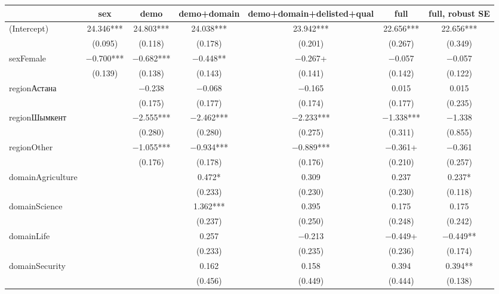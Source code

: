 \begin{table}
\centering
\begin{tabular}[t]{lcccccc}
\toprule
  & sex & demo & demo+domain & demo+domain+delisted+qual & full & full, robust SE\\
\midrule
(Intercept) & \num{24.346}*** & \num{24.803}*** & \num{24.038}*** & \num{23.942}*** & \num{22.656}*** & \num{22.656}***\\
 & (\num{0.095}) & (\num{0.118}) & (\num{0.178}) & (\num{0.201}) & (\num{0.267}) & (\num{0.349})\\
sexFemale & \num{-0.700}*** & \num{-0.682}*** & \num{-0.448}** & \num{-0.267}+ & \num{-0.057} & \num{-0.057}\\
 & (\num{0.139}) & (\num{0.138}) & (\num{0.143}) & (\num{0.141}) & (\num{0.142}) & (\num{0.122})\\
regionАстана &  & \num{-0.238} & \num{-0.068} & \num{-0.165} & \num{0.015} & \num{0.015}\\
 &  & (\num{0.175}) & (\num{0.177}) & (\num{0.174}) & (\num{0.177}) & (\num{0.235})\\
regionШымкент &  & \num{-2.555}*** & \num{-2.462}*** & \num{-2.233}*** & \num{-1.338}*** & \num{-1.338}\\
 &  & (\num{0.280}) & (\num{0.280}) & (\num{0.275}) & (\num{0.311}) & (\num{0.855})\\
regionOther &  & \num{-1.055}*** & \num{-0.934}*** & \num{-0.889}*** & \num{-0.361}+ & \num{-0.361}\\
 &  & (\num{0.176}) & (\num{0.178}) & (\num{0.176}) & (\num{0.210}) & (\num{0.257})\\
domainAgriculture &  &  & \num{0.472}* & \num{0.309} & \num{0.237} & \num{0.237}*\\
 &  &  & (\num{0.233}) & (\num{0.230}) & (\num{0.230}) & (\num{0.118})\\
domainScience &  &  & \num{1.362}*** & \num{0.395} & \num{0.175} & \num{0.175}\\
 &  &  & (\num{0.237}) & (\num{0.250}) & (\num{0.248}) & (\num{0.242})\\
domainLife &  &  & \num{0.257} & \num{-0.213} & \num{-0.449}+ & \num{-0.449}**\\
 &  &  & (\num{0.233}) & (\num{0.235}) & (\num{0.236}) & (\num{0.174})\\
domainSecurity &  &  & \num{0.162} & \num{0.158} & \num{0.394} & \num{0.394}**\\
 &  &  & (\num{0.456}) & (\num{0.449}) & (\num{0.444}) & (\num{0.138})\\

\end{tabular}
\end{table}
